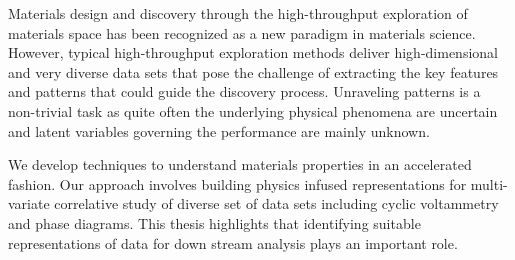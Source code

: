 Materials design and discovery through the high-throughput exploration of materials space has been recognized as a new paradigm in materials science. However, typical high-throughput exploration methods deliver high-dimensional and very diverse data sets that pose the challenge of extracting the key features and patterns that could guide the discovery process. Unraveling patterns is a non-trivial task as quite often the underlying physical phenomena are uncertain and latent variables governing the performance are mainly unknown. 

We develop techniques to understand materials properties in an accelerated fashion. 
Our approach involves building physics infused representations for multi-variate correlative study of diverse set of data sets including cyclic voltammetry and phase diagrams. 
This thesis highlights that identifying suitable representations of data for down stream analysis plays an important role.